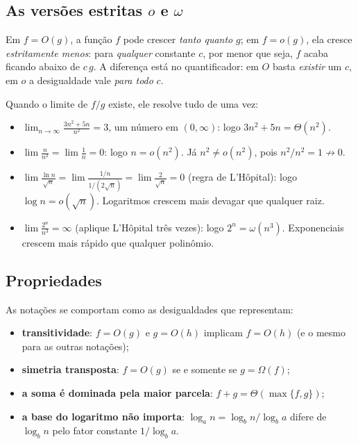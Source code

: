 \subsection*{As versões estritas $o$ e $\omega$}
Em $f=O(g)$, a função $f$ pode crescer \emph{tanto quanto} $g$; em $f=o(g)$, ela cresce \emph{estritamente menos}: para \emph{qualquer} constante $c$, por menor que seja, $f$ acaba ficando abaixo de $c\,g$. A diferença está no quantificador: em $O$ basta \emph{existir} um $c$, em $o$ a desigualdade vale \emph{para todo} $c$.

\begin{exemplo}\label{ex:limites}
Quando o limite de $f/g$ existe, ele resolve tudo de uma vez:
\begin{itemize}
  \item $\displaystyle\lim_{n\to\infty}\frac{3n^2+5n}{n^2}=3$, um número em $(0,\infty)$: logo $3n^2+5n=\Theta(n^2)$.
  \item $\displaystyle\lim\frac{n}{n^2}=\lim\frac1n=0$: logo $n=o(n^2)$. Já $n^2\ne o(n^2)$, pois $n^2/n^2=1\not\to0$.
  \item $\displaystyle\lim\frac{\ln n}{\sqrt n}=\lim\frac{1/n}{1/(2\sqrt n)}=\lim\frac{2}{\sqrt n}=0$ (regra de L'Hôpital): logo $\log n=o(\sqrt n)$. Logaritmos crescem mais devagar que qualquer raiz.
  \item $\displaystyle\lim\frac{2^n}{n^3}=\infty$ (aplique L'Hôpital três vezes): logo $2^n=\omega(n^3)$. Exponenciais crescem mais rápido que qualquer polinômio.
\end{itemize}
\end{exemplo}

\subsection*{Propriedades}
As notações se comportam como as desigualdades que representam:
\begin{itemize}
  \item \textbf{transitividade}: $f=O(g)$ e $g=O(h)$ implicam $f=O(h)$ (e o mesmo para as outras notações);
  \item \textbf{simetria transposta}: $f=O(g)$ se e somente se $g=\Omega(f)$;
  \item \textbf{a soma é dominada pela maior parcela}: $f+g=\Theta(\max\{f,g\})$;
  \item \textbf{a base do logaritmo não importa}: $\log_an=\log_bn/\log_ba$ difere de $\log_bn$ pelo fator constante $1/\log_ba$.
\end{itemize}

